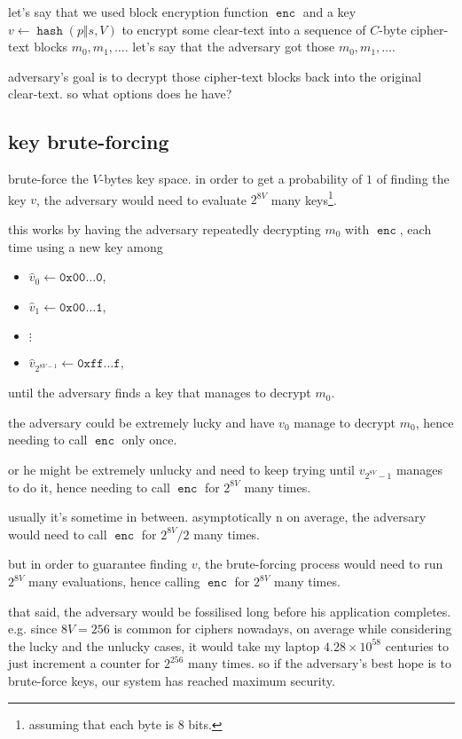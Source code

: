 \documentclass[twocolumn]{article}
\DeclareMathOperator{\enc}{\mathtt{enc}}
\DeclareMathOperator{\hash}{\mathtt{hash}}
\begin{document}
let's say that we used block encryption function $\enc$ and a key $v \gets
\hash(p \Vert s, V)$ to encrypt some clear-text into a sequence of $C$-byte
cipher-text blocks $m_0, m_1, \ldots$.  let's say that the adversary got
those $m_0, m_1, \ldots$.

adversary's goal is to decrypt those cipher-text blocks back into the
original clear-text.  so what options does he have?

\subsection{key brute-forcing}
brute-force the $V$-bytes key space.  in order to get a probability of $1$
of finding the key $v$, the adversary would need to evaluate $2^{8V}$ many
keys\footnote{assuming that each byte is $8$ bits.}.

this works by having the adversary repeatedly decrypting $m_0$ with $\enc$,
each time using a new key among
\begin{itemize}
    \item $\hat v_0 \gets \texttt{0x00\ldots 0}$,
    \item $\hat v_1 \gets \texttt{0x00\ldots 1}$,
    \item $\vdots$
    \item $\hat v_{2^{8V-1}} \gets \texttt{0xff\ldots f}$,
\end{itemize}
until the adversary finds a key that manages to decrypt $m_0$.

the adversary could be extremely lucky and have $v_0$ manage to decrypt
$m_0$, hence needing to call $\enc$ only once.  

or he might be extremely unlucky and need to keep trying until
$v_{2^{8V}-1}$ manages to do it, hence needing to call $\enc$ for $2^{8V}$
many times.

usually it's sometime in between.  asymptotically  n on average, the
adversary would need to call $\enc$ for $2^{8V}/2$ many times.

but in order to guarantee finding $v$, the brute-forcing process would need
to run $2^{8V}$ many evaluations, hence calling $\enc$ for $2^{8V}$ many
times.

that said, the adversary would be fossilised long before his application
completes.  e.g.  since $8V = 256$ is common for ciphers nowadays, on
average while considering the lucky and the unlucky cases, it would take my
laptop $4.28\times10^{58}$ centuries to just increment a counter for
$2^{256}$ many times.  so if the adversary's best hope is to brute-force
keys, our system has reached maximum security.
\end{document}
